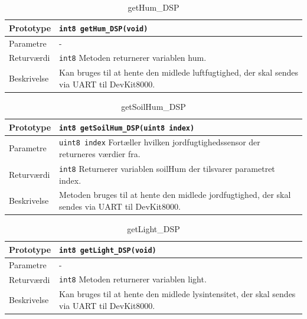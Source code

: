 
\begin{table}[h]
\begin{tabularx}{\textwidth}{| L{2.5 cm} | Z |} \hline
Prototype & \texttt{int8 getHum\_DSP(void)} \\\hline
Parametre & - \\\hline
Returværdi & \texttt{int8} \newline
Metoden returnerer variablen hum. \\\hline
Beskrivelse & Kan bruges til at hente den midlede luftfugtighed, der skal sendes via UART til DevKit8000. \\\hline
\end{tabularx}
\caption{getHum\_DSP}
\label{table:getHum_DSP}
\end{table}

\clearpage


\clearpage

\begin{table}[h]
\begin{tabularx}{\textwidth}{| L{2.5 cm} | Z |} \hline
Prototype & \texttt{int8 getSoilHum\_DSP(uint8 index)} \\\hline
Parametre & \texttt{uint8 index} \newline
Fortæller hvilken jordfugtighedssensor der returneres værdier fra. \\\hline
Returværdi & \texttt{int8} \newline
Returnerer variablen soilHum der tilsvarer parametret index. \\\hline
Beskrivelse & Metoden bruges til at hente den midlede jordfugtighed, der skal sendes via UART til DevKit8000. \\\hline
\end{tabularx}
\caption{getSoilHum\_DSP}
\label{table:getSoilHum_DSP}
\end{table}


\begin{table}[h]
\begin{tabularx}{\textwidth}{| L{2.5 cm} | Z |} \hline
Prototype & \texttt{int8 getLight\_DSP(void)} \\\hline
Parametre & - \\\hline
Returværdi & \texttt{int8} \newline
Metoden returnerer variablen light. \\\hline
Beskrivelse & Kan bruges til at hente den midlede lysintensitet, der skal sendes via UART til DevKit8000. \\\hline
\end{tabularx}
\caption{getLight\_DSP}
\label{table:getLight_DSP}
\end{table}

